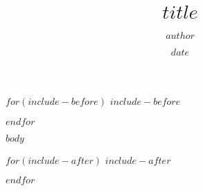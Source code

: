 \documentclass[11pt, twoside]{extarticle}
\author{$author$}
\title{$title$}
\date{$date$}
\begin{document}
\maketitle

$for(include-before)$
$include-before$

$endfor$

$body$

$for(include-after)$
$include-after$

$endfor$
\end{document}
